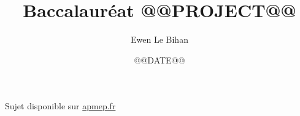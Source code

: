 \documentclass{article}
\title{Baccalauréat @@PROJECT@@}
\author{Ewen Le Bihan}
\date{@@DATE@@}
\begin{document}
\maketitle

\abstract{}

Sujet disponible sur \href{https://apmep.fr/}{apmep.fr}

\section*{}
\end{document}
